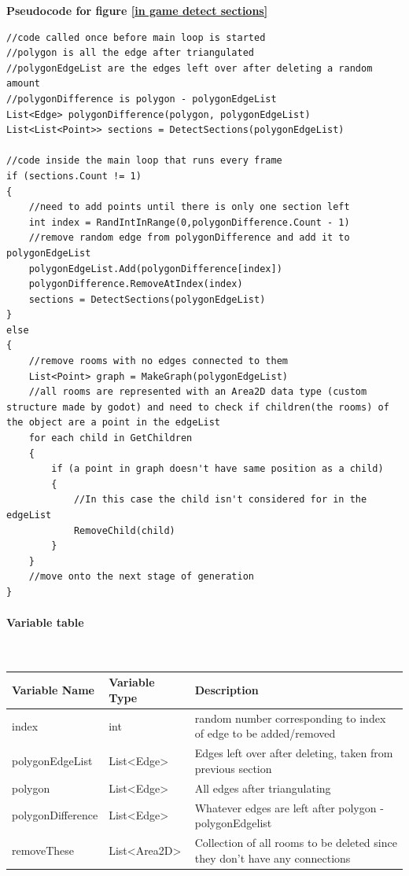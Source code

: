 \documentclass{article}
\newcommand{\myparagraph}[1]{\paragraph{#1}\mbox{}\\} %
\newcommand{\smallBr}{\vspace{1.5mm}}
\begin{document}
\textbf{Pseudocode for figure \ref{in game detect sections}}
\begin{lstlisting}
//code called once before main loop is started
//polygon is all the edge after triangulated
//polygonEdgeList are the edges left over after deleting a random amount
//polygonDifference is polygon - polygonEdgeList
List<Edge> polygonDifference(polygon, polygonEdgeList)
List<List<Point>> sections = DetectSections(polygonEdgeList)

//code inside the main loop that runs every frame
if (sections.Count != 1)
{
	//need to add points until there is only one section left
	int index = RandIntInRange(0,polygonDifference.Count - 1)
	//remove random edge from polygonDifference and add it to polygonEdgeList
	polygonEdgeList.Add(polygonDifference[index])
	polygonDifference.RemoveAtIndex(index)
	sections = DetectSections(polygonEdgeList)
}
else
{
	//remove rooms with no edges connected to them
	List<Point> graph = MakeGraph(polygonEdgeList)
	//all rooms are represented with an Area2D data type (custom structure made by godot) and need to check if children(the rooms) of the object are a point in the edgeList
	for each child in GetChildren
	{
		if (a point in graph doesn't have same position as a child)
		{
			//In this case the child isn't considered for in the edgeList
			RemoveChild(child)
		}
	}
	//move onto the next stage of generation
}
\end{lstlisting}

\myparagraph{Variable table}
\smallBr
\begin{tabular}{l|l|l}
Variable Name     & Variable Type                       & Description                                                                 \\ \hline
index             & int                                 & random number corresponding to index of edge to be added/removed                     \\
polygonEdgeList   & List\textless{}Edge\textgreater{}   & Edges left over after deleting, taken from previous section                                              \\
polygon           & List\textless{}Edge\textgreater{}   & All edges after triangulating                                               \\
polygonDifference & List\textless{}Edge\textgreater{}   & Whatever edges are left after polygon - polygonEdgelist                     \\
removeThese       & List\textless{}Area2D\textgreater{} & Collection of all rooms to be deleted since they don't have any connections
\end{tabular}
\end{document}
